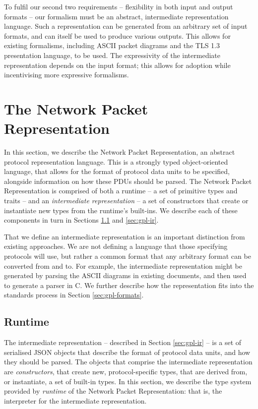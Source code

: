 \documentclass[10pt,sigconf]{acmart}
\begin{document}
To fulfil our second two requirements -- flexibility in both input and output formats --
our formalism must be an abstract, intermediate representation language. Such a
representation can be generated from an arbitrary set of input formats, and can itself be
used to produce various outputs. This allows for existing formalisms, including ASCII
packet diagrams and the TLS 1.3 presentation language, to be used. The expressivity
of the intermediate representation depends on the input format; this allows for adoption
while incentivising more expressive formalisms.

\section{The Network Packet Representation}
\label{sec:gpl}

In this section, we describe the Network Packet Representation, an abstract protocol
representation language. This is a strongly typed object-oriented language, that allows
for the format of protocol data units to be specified, alongside information on how these
PDUs should be parsed. The Network Packet Representation is comprised of both a runtime -- a set
of primitive types and traits -- and an \emph{intermediate representation} -- a set of
constructors that create or instantiate new types from the runtime's built-ins. We
describe each of these components in turn in Sections \ref{sec:gpl-runtime} and
\ref{sec:gpl-ir}.

That we define an intermediate representation is an important distinction from
existing approaches. We are not defining a language that those specifying protocols will
use, but rather a common format that any arbitrary format can be converted from and to.
For example, the intermediate representation might be generated by parsing the ASCII
diagrams in existing documents, and then used to generate a parser in C. We further
describe how the representation fits into the standards process in Section \ref{sec:gpl-formats}.

\subsection{Runtime}
\label{sec:gpl-runtime}

The intermediate representation -- described in Section \ref{sec:gpl-ir} -- is a set of
serialised JSON objects that describe the format of protocol data units, and how they
should be parsed. The objects that comprise the intermediate representation are
\emph{constructors}, that create new, protocol-specific types, that are derived from, or
instantiate, a set of built-in types. In this section, we describe the type system
provided by \emph{runtime} of the Network Packet Representation: that is, the interpreter for
the intermediate representation.
\end{document}
